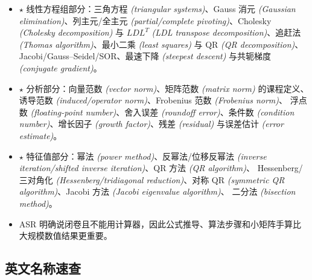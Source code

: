 \documentclass{article}
\newcommand{\keypoint}{\textcolor{red!65!black}{\textbf{$\star$}}}
\newcommand{\eng}[1]{\texorpdfstring{{\normalfont\rmfamily\itshape\textcolor{blue!65!black}{(#1)}}}{(#1)}}
\begin{document}
\begin{itemize}
  \item \keypoint{} 线性方程组部分：三角方程 \eng{triangular systems}、Gauss 消元
  \eng{Gaussian elimination}、列主元/全主元 \eng{partial/complete pivoting}、Cholesky
  \eng{Cholesky decomposition} 与 $LDL^T$ \eng{LDL transpose decomposition}、追赶法
  \eng{Thomas algorithm}、最小二乘 \eng{least squares} 与 QR \eng{QR decomposition}、
  Jacobi/Gauss--Seidel/SOR、最速下降 \eng{steepest descent} 与共轭梯度
  \eng{conjugate gradient}。
  \item \keypoint{} 分析部分：向量范数 \eng{vector norm}、矩阵范数 \eng{matrix norm}
  的课程定义、诱导范数 \eng{induced/operator norm}、Frobenius 范数 \eng{Frobenius norm}、
  浮点数 \eng{floating-point number}、舍入误差 \eng{roundoff error}、条件数
  \eng{condition number}、增长因子 \eng{growth factor}、残差 \eng{residual}
  与误差估计 \eng{error estimate}。
  \item \keypoint{} 特征值部分：幂法 \eng{power method}、反幂法/位移反幂法
  \eng{inverse iteration/shifted inverse iteration}、QR 方法 \eng{QR algorithm}、
  Hessenberg/三对角化 \eng{Hessenberg/tridiagonal reduction}、对称 QR
  \eng{symmetric QR algorithm}、Jacobi 方法 \eng{Jacobi eigenvalue algorithm}、
  二分法 \eng{bisection method}。
  \item ASR 明确说闭卷且不能用计算器，因此公式推导、算法步骤和小矩阵手算比大规模数值结果更重要。
\end{itemize}

\subsection{英文名称速查}
\end{document}
